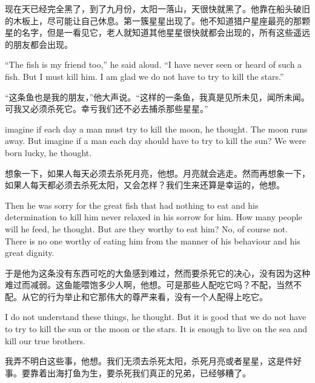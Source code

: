 \begin{paracol}{2}
\switchcolumn

现在天已经完全黑了，到了九月份，太阳一落山，天很快就黑了。他靠在船头破旧的木板上，尽可能让自己休息。第一簇星星出现了。他不知道猎户星座最亮的那颗星的名字，但是一看见它，老人就知道其他星星很快就都会出现的，所有这些遥远的朋友都会出现。

\switchcolumn*

``The fish is my friend too,'' he said aloud. ``I have never seen or heard
of such a fish. But I must kill him. I am glad we do not have to try to kill
the stars.''

\switchcolumn

“这条鱼也是我的朋友，”他大声说。“这样的一条鱼，我真是见所未见，闻所未闻。可我又必须杀死它。幸亏我们还不必去捕杀那些星星。”

\switchcolumn*

\Gls{imagine} if each day a man must try to kill the moon, he thought. The moon
runs away. But imagine if a man each day should have to try to kill the sun?
We were born lucky, he thought.

\switchcolumn

想象一下，如果人每天必须去杀死月亮，他想。月亮就会逃走。然而再想象一下，如果人每天都必须去杀死太阳，又会怎样？我们生来还算是幸运的，他想。

\switchcolumn*

Then he was sorry for the great fish that had nothing to eat and his
\gls{determination} to kill him never \gls{relaxed} in his \gls{sorrow} for
him. How many people will he feed, he thought. But are they worthy to eat
him? No, of course not. There is no one worthy of eating him from the
\gls{manner} of his \gls{behaviour} and his great \gls{dignity}.

\switchcolumn

于是他为这条没有东西可吃的大鱼感到难过，然而要杀死它的决心，没有因为这种难过而减弱。这鱼能喂饱多少人啊，他想。可是那些人配吃它吗？不配，当然不配。从它的行为举止和它那伟大的尊严来看，没有一个人配得上吃它。

\switchcolumn*

I do not understand these things, he thought. But it is good that we do not
have to try to kill the sun or the moon or the stars. It is enough to live
on the sea and kill our true brothers.

\switchcolumn

我弄不明白这些事，他想。我们无须去杀死太阳，杀死月亮或者星星，这是件好事。要靠着出海打鱼为生，要杀死我们真正的兄弟，已经够糟了。

\switchcolumn*


\end{paracol}
